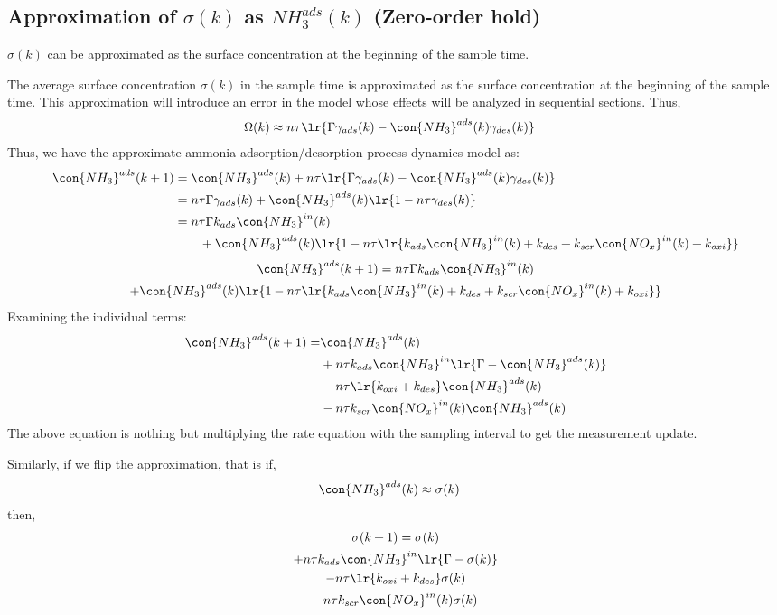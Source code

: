 \subsection{Approximation of $\sigma(k)$ as $NH_3^{ads}(k)$ (Zero-order hold)}
 $\sigma(k)$ can be approximated as the surface concentration at the beginning of the sample time.

The average surface concentration $\sigma(k)$ in the sample time is approximated as the surface concentration at the
beginning of the sample time. This approximation will introduce an error in the model whose effects will be analyzed in
sequential sections. Thus,
\begin{align}
    \Omega(k) &\approx n \tau \lr{\Gamma \gamma_{ads} (k) - \con{NH_3}^{ads}(k) \gamma_{des} (k)}
\end{align}
Thus, we have the approximate ammonia adsorption/desorption process dynamics model as:
\begin{align*}
    \con{NH_3}^{ads}(k + 1) &= \con{NH_3}^{ads} (k) + n \tau \lr{\Gamma \gamma_{ads} (k) - \con{NH_3}^{ads}(k) \gamma_{des} (k)}\\
    &= n \tau \Gamma \gamma_{ads} (k) + \con{NH_3}^{ads} (k) \lr{1 - n \tau \gamma_{des} (k)}\\
    &= n \tau \Gamma k_{ads} \con{NH_3}^{in}(k)  \\
    &\qquad + \con{NH_3}^{ads} (k) \lr{1 - n \tau \lr{k_{ads} \con{NH_3}^{in}(k) + k_{des} + k_{scr} \con{NO_x}^{in}(k) + k_{oxi}}}
\end{align*}
\begin{multline}
    \con{NH_3}^{ads}(k + 1) = n \tau \Gamma k_{ads} \con{NH_3}^{in}(k)  \\
        + \con{NH_3}^{ads} (k) \lr{1 - n \tau \lr{k_{ads} \con{NH_3}^{in}(k) + k_{des} + k_{scr} \con{NO_x}^{in}(k) + k_{oxi}}}
\end{multline}
Examining the individual terms:
\begin{align*}
    \con{NH_3}^{ads}(k + 1) =& \con{NH_3}^{ads}(k)\\
        &+ n\tau k_{ads} \con{NH_3}^{in} \lr{\Gamma - \con{NH_3}^{ads}(k)} \\
        &- n \tau \lr{k_{oxi} + k_{des}} \con{NH_3}^{ads} (k)\\
        &- n \tau k_{scr} \con{NO_x}^{in}(k) \con{NH_3}^{ads}(k)
\end{align*}
The above equation is nothing but multiplying the rate equation with the sampling interval to get the measurement
update.

Similarly, if we flip the approximation, that is if,
\begin{align*}
    \con{NH_3}^{ads}(k) &\approx \sigma(k)
\end{align*}
then,
\begin{multline}
    \sigma(k + 1) = \sigma(k)\\
        + n\tau k_{ads} \con{NH_3}^{in} \lr{\Gamma - \sigma(k)} \\
        - n \tau \lr{k_{oxi} + k_{des}} \sigma(k)\\
        - n \tau k_{scr} \con{NO_x}^{in}(k) \sigma(k)
\end{multline}
